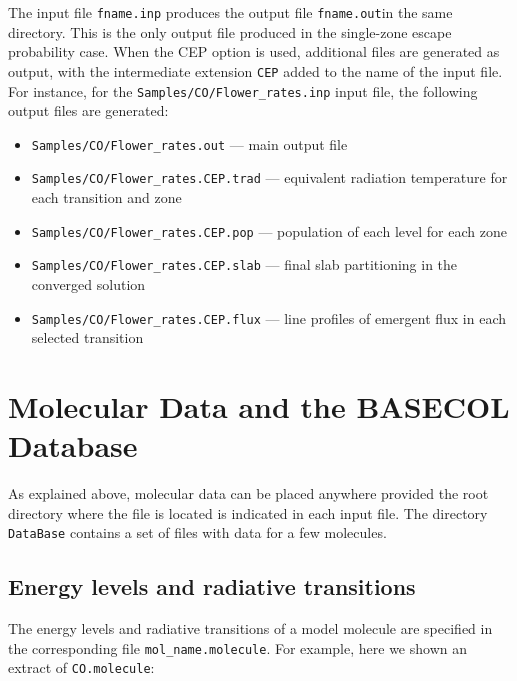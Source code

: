\documentclass[12pt]{article}
\begin{document}
The input file \texttt{fname.inp} produces the output file \texttt{fname.out}in
the same directory. This is the only output file produced in the single-zone
escape probability case. When the CEP option is used, additional files are
generated as output, with the intermediate extension \texttt{CEP} added to the
name of the input file. For instance, for the
\texttt{Samples/CO/Flower\_rates.inp} input file, the following output files
are generated:
\begin{itemize}
\item
\texttt{Samples/CO/Flower\_rates.out} --- main output file
\item
\texttt{Samples/CO/Flower\_rates.CEP.trad} --- equivalent radiation
temperature for each transition and zone
\item
\texttt{Samples/CO/Flower\_rates.CEP.pop} --- population of each level for
each zone
\item
\texttt{Samples/CO/Flower\_rates.CEP.slab} --- final slab partitioning in
the converged solution
\item
\texttt{Samples/CO/Flower\_rates.CEP.flux} --- line profiles of emergent
flux in each selected transition
\end{itemize}

\section{Molecular Data and the BASECOL Database}
\label{sec:basecol}


As explained above, molecular data can be placed anywhere provided the root
directory where the file is located is indicated in each input file. The directory
\texttt{DataBase} contains a set of files with data for a few molecules. 

\subsection{Energy levels and radiative transitions}
The energy levels and radiative transitions of a model molecule are specified in the
corresponding file \texttt{mol\_name.molecule}.  For example, here we shown an extract
of \texttt{CO.molecule}:

\newpage
\end{document}
